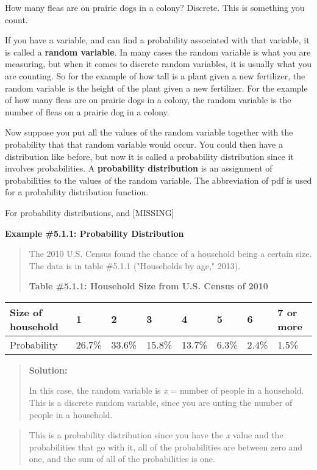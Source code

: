 \documentclass[]{book}
\begin{document}
How many fleas are on prairie dogs in a colony? Discrete. This is something you count.

If you have a variable, and can find a probability associated with that variable, it is called a \textbf{random variable}. In many cases the random variable is what you are measuring, but when it comes to discrete random variables, it is usually what you are counting. So for the example of how tall is a plant given a new fertilizer, the random variable is the height of the plant given a new fertilizer. For the example of how many fleas are on prairie dogs in a colony, the random variable is the number of fleas on a prairie dog in a colony.

Now suppose you put all the values of the random variable together with the probability that that random variable would occur. You could then have a distribution like before, but now it is called a probability distribution since it involves probabilities. A \textbf{probability distribution} is an assignment of probabilities to the values of the random variable. The abbreviation of pdf is used for a probability distribution function.

For probability distributions, and {[}MISSING{]}

\textbf{Example \#5.1.1: Probability Distribution}

\begin{quote}
The 2010 U.S. Census found the chance of a household being a certain
size. The data is in table \#5.1.1 ("Households by age," 2013).

\textbf{Table \#5.1.1: Household Size from U.S. Census of 2010}
\end{quote}

\begin{longtable}[]{@{}llllllll@{}}
\toprule
Size of household & 1 & 2 & 3 & 4 & 5 & 6 & 7 or more\tabularnewline
\midrule
\endhead
Probability & 26.7\% & 33.6\% & 15.8\% & 13.7\% & 6.3\% & 2.4\% & 1.5\%\tabularnewline
\bottomrule
\end{longtable}

\begin{quote}
\textbf{Solution:}

In this case, the random variable is \emph{x} = number of people in a household. This is a discrete random variable, since you are unting the number of people in a household.
\end{quote}

\begin{quote}
This is a probability distribution since you have the \emph{x} value and the probabilities that go with it, all of the probabilities are between zero and one, and the sum of all of the probabilities is one.
\end{quote}
\end{document}
